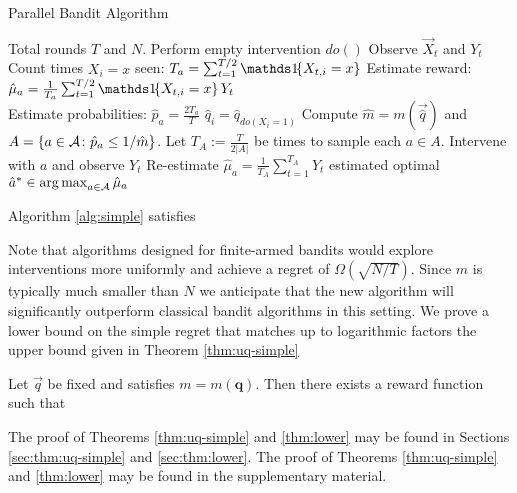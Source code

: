 \begin{algorithm}[h]
\caption{Parallel Bandit Algorithm}\label{alg:simple}
\begin{algorithmic}[1]
 Total rounds $T$ and $N$.
\STATE Perform empty intervention $do()$
\STATE Observe $\vec{X}_t$ and $Y_t$
\ENDFOR
{}
\STATE Count times $X_i = x$ seen: $T_a = \sum_{t=1}^{T/2} \ind{X_{t,i} = x}$
\STATE Estimate reward: $\hat{\mu}_a = \frac{1}{T_a} \sum_{t=1}^{T/2} \ind{X_{t,i} = x} Y_t$ \\[0.2cm]
\STATE Estimate probabilities: $\hat{p}_a = \frac{2 T_a}{T}$ 
\STATE $\hat q_i = \hat{q}_{do(X_i = 1)}$
\ENDFOR
\STATE Compute $\hat{m} = m(\vec{\hat q})$ and $A = \left\{a \in \mathcal{A} \colon \hat{p}_a \leq 1/\hat m\right\}$.
\STATE Let $T_A := \frac{T}{2 |A|}$ be times to sample each $a\in A$.
\STATE Intervene with $a$ and observe $Y_t$
\ENDFOR
\STATE Re-estimate $\hat{\mu}_a = \frac{1}{T_A} \sum_{t=1}^{T_A} Y_t$
\ENDFOR
\RETURN estimated optimal $\hat{a}^* \in \argmax_{a\in\actions} \hat{\mu}_a$
\end{algorithmic}
\end{algorithm}

\begin{theorem}\label{thm:uq-simple}
Algorithm \ref{alg:simple} satisfies
\end{theorem}

Note that algorithms designed for finite-armed bandits would explore interventions more uniformly and achieve a regret of $\Omega(\sqrt{N/T})$.
Since $m$ is typically much smaller than $N$ we anticipate that the new algorithm will significantly outperform classical bandit algorithms in
this setting.
We prove a lower bound on the simple regret that matches up to logarithmic factors the upper bound given in Theorem \ref{thm:uq-simple}

\begin{theorem}\label{thm:lower}
Let $\vec{q}$ be fixed and satisfies $m = m(\boldsymbol{q})$. Then there exists a reward function such that
\end{theorem}

\ifsup
The proof of Theorems \ref{thm:uq-simple} and \ref{thm:lower} may be found in Sections \ref{sec:thm:uq-simple} and \ref{sec:thm:lower}.
\else
The proof of Theorems \ref{thm:uq-simple} and \ref{thm:lower} may be found in the supplementary material.
\fi



